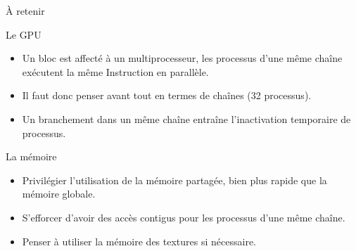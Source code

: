 \begin{frame}{\`A retenir}
\begin{block}{Le GPU}
   \begin{itemize}
    \item<+-> Un bloc est affecté à un multiprocesseur, les processus d'une même chaîne exécutent la même Instruction
    en parallèle.
    \item<+-> Il faut donc penser avant tout en termes de chaînes (32 processus).
    \item<+-> Un branchement dans un même chaîne entraîne l'inactivation temporaire de processus.
   \end{itemize} 
\end{block}
\begin{block}{La mémoire}
  \begin{itemize}
   \item<+-> Privilégier l'utilisation de la mémoire partagée, bien plus rapide que la mémoire globale.
   \item<+-> S'efforcer d'avoir des accès contigus pour les processus d'une même chaîne.
   \item<+-> Penser à utiliser la mémoire des textures si nécessaire.
  \end{itemize} 
\end{block}
\end{frame}
